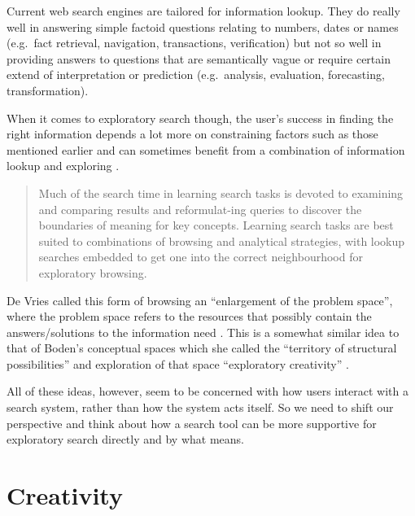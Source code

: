 Current web search engines are tailored for information lookup. They do really well in answering simple factoid questions relating to numbers, dates or names (e.g.\ fact retrieval, navigation, transactions, verification) but not so well in providing answers to questions that are semantically vague or require certain extend of interpretation or prediction (e.g.\ analysis, evaluation, forecasting, transformation).

When it comes to exploratory search though, the user’s success in finding the right information depends a lot more on constraining factors such as those mentioned earlier and can sometimes benefit from a combination of information lookup and exploring \autocite{Marchionini2006}.

\begin{quote}
  Much of the search time in learning search tasks is devoted to examining and comparing results and reformulat-ing queries to discover the boundaries of meaning for key concepts. Learning search tasks are best suited to combinations of browsing and analytical strategies, with lookup searches embedded to get one into the correct neighbourhood for exploratory browsing. \autocite{Marchionini2006}
\end{quote}

De Vries called this form of browsing an ``enlargement of the problem space'', where the problem space refers to the resources that possibly contain the answers/solutions to the information need \autocite{DeVries1993}. This is a somewhat similar idea to that of Boden’s conceptual spaces which she called the ``territory of structural possibilities'' and exploration of that space ``exploratory creativity'' \autocite{Boden2003}.

All of these ideas, however, seem to be concerned with how users interact with a search system, rather than how the system acts itself. So we need to shift our perspective and think about how a search tool can be more supportive for exploratory search directly and by what means.


\section{Creativity}


